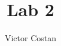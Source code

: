\documentclass{article}
\newcommand{\PsetAuthorName}{Victor Costan}
\newcommand{\PsetTitle}{Lab 2}
\newcommand{\PsetMainFile}{6.823/lab3/all.tex}
\begin{document}
\title{\PsetClassNumber\space\PsetClassTerm\space\PsetTitle}
\author{\PsetAuthorName}
\maketitle


\end{document}
